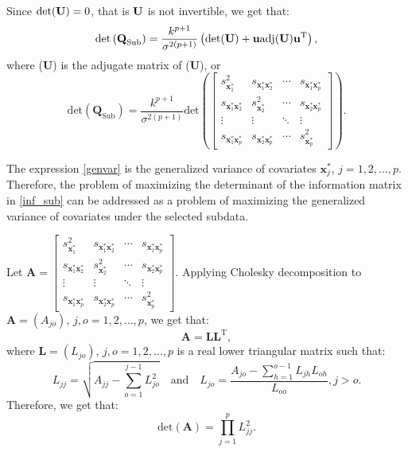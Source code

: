 \documentclass[12pt]{article}
\theoremstyle{definition}
\begin{document}
	Since $\text{det}(\textbf{\text{U}})=0$, that is $\textbf{\text{U}}$ is not invertible, we get that: 
	\begin{equation*}
		\text{det}\left(\textbf{Q}_{\text{Sub}}\right)=\dfrac{k^{p+1}}{\sigma^{2(p+1)}}\left(\text{det}(\textbf{\text{U}})+\textbf{u}\text{adj}(\textbf{\text{U}})\textbf{u}^{\text{T}}\right),
	\end{equation*}
	where (\textbf{U}) is the adjugate matrix of (\textbf{U}), or
	\begin{equation}\label{genvar}
		\text{det}\left(\textbf{Q}_{\text{Sub}}\right)=\dfrac{k^{p+1}}{\sigma^{2(p+1)}}\text{det}\left(\begin{bmatrix}
			s_{\textbf{x}_1^*}^2 & s_{\textbf{x}_1^*\textbf{x}_2^*} & \cdots & s_{\textbf{x}_1^*\textbf{x}_p^*}\\
			s_{\textbf{x}_1^*\textbf{x}_2^*} & s_{\textbf{x}_2^*}^2 & \cdots & s_{\textbf{x}_2^*\textbf{x}_p^*}\\
			\vdots & \vdots & \ddots & \vdots \\
			s_{\textbf{x}_1^*\textbf{x}_p^*} & s_{\textbf{x}_2^*\textbf{x}_p^*} & \cdots & s_{\textbf{x}_p^*}^2
		\end{bmatrix}\right).
	\end{equation}
	
	The expression \eqref{genvar} is the generalized variance \citep{wilks1932genvar} of covariates $\textbf{x}_j^*$, $j=1,2,\ldots,p$. Therefore, the problem of maximizing the determinant of the information matrix in \eqref{inf_sub} can be addressed as a problem of maximizing the generalized variance of covariates under the selected subdata.
	
	Let $\textbf{A}=\begin{bmatrix}
		s_{\textbf{x}_1^*}^2 & s_{\textbf{x}_1^*\textbf{x}_2^*} & \cdots & s_{\textbf{x}_1^*\textbf{x}_p^*}\\
		s_{\textbf{x}_1^*\textbf{x}_2^*} & s_{\textbf{x}_2^*}^2 & \cdots & s_{\textbf{x}_2^*\textbf{x}_p^*}\\
		\vdots & \vdots & \ddots & \vdots \\
		s_{\textbf{x}_1^*\textbf{x}_p^*} & s_{\textbf{x}_2^*\textbf{x}_p^*} & \cdots & s_{\textbf{x}_p^*}^2
	\end{bmatrix}$. Applying Cholesky decomposition to $\textbf{A}=(A_{jo})$, $j,o=1,2,\ldots,p$, we get that:
	\begin{equation*}
		\textbf{A}=\textbf{L}\textbf{L}^{\text{T}},
	\end{equation*}
	where $\textbf{L}=(L_{jo})$, $j,o=1,2,\ldots,p$ is a real lower triangular matrix such that:
	\begin{equation*}
		L_{jj}=\sqrt{A_{jj}-\sum_{o=1}^{j-1}L_{jo}^2} \quad \text{and} \quad L_{jo}=\dfrac{A_{jo}-\sum_{h=1}^{o-1}L_{jh}L_{oh}}{L_{oo}}, j>o.
	\end{equation*}
	Therefore, we get that:
	\begin{equation}\label{genvar_chol}
		\text{det}(\textbf{A})=\prod_{j=1}^{p}L_{jj}^2.
	\end{equation}
	
\end{document}
